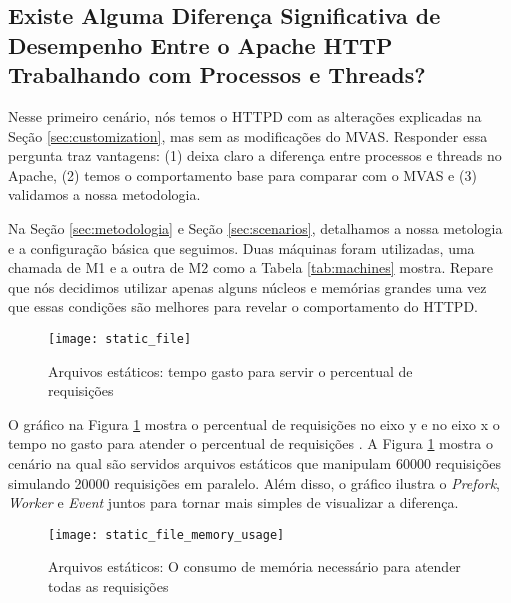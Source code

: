 \subsection{Existe Alguma Diferença Significativa de Desempenho Entre o Apache
HTTP Trabalhando com Processos e Threads?}

Nesse primeiro cenário, nós temos o HTTPD com as alterações explicadas na Seção
\ref{sec:customization}, mas sem as modificações do MVAS. Responder essa
pergunta traz vantagens: (1) deixa claro a diferença entre processos e threads
no Apache, (2) temos o comportamento base para comparar com o MVAS e (3)
validamos a nossa metodologia.




Na Seção \ref{sec:metodologia} e Seção \ref{sec:scenarios}, detalhamos a nossa
metologia e a configuração básica que seguimos. Duas máquinas foram utilizadas,
uma chamada de M1 e a outra de M2 como a Tabela \ref{tab:machines} mostra.
Repare que nós decidimos utilizar apenas alguns núcleos e memórias grandes uma
vez que essas condições são melhores para revelar o comportamento do HTTPD.

\begin{figure}[!h]
  \centering
  \texttt{[image: static\_file]}

  \caption{Arquivos estáticos: tempo gasto para servir o percentual de requisições}
  \label{fig:static_file}
\end{figure}

O gráfico na Figura \ref{fig:static_file} mostra o percentual de requisições no
eixo y e no eixo x o tempo no gasto para atender o percentual de requisições
\citep{apache_ab}. A Figura \ref{fig:static_file} mostra o cenário na qual são
servidos arquivos estáticos que manipulam 60000 requisições simulando 20000
requisições em paralelo. Além disso, o gráfico ilustra o \emph{Prefork},
\emph{Worker} e \emph{Event} juntos para tornar mais simples de visualizar a
diferença.

\begin{figure}[!h]
  \centering
  \texttt{[image: static\_file\_memory\_usage]}

  \caption{Arquivos estáticos: O consumo de memória necessário para atender todas as requisições}
  \label{fig:static_file_memory}
\end{figure}
 
